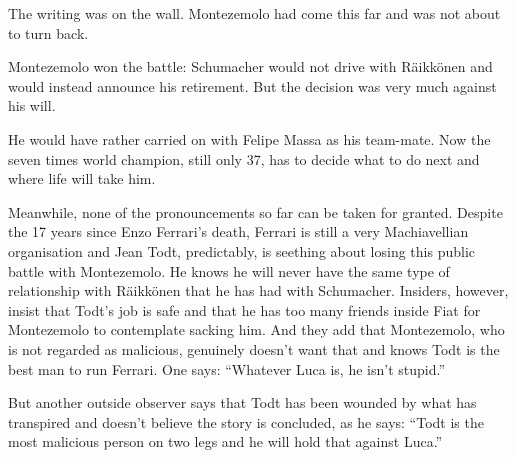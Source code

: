 \documentclass{article}
\begin{document}
The writing was on the wall. Montezemolo had come this far and was not about to turn back.

Montezemolo won the battle: Schumacher would not drive with Räikkönen and would instead announce his retirement. But the decision was very much against his will.

He would have rather carried on with Felipe Massa as his team-mate. Now the seven times world champion, still only 37, has to decide what to do next and where life will take him.

Meanwhile, none of the pronouncements so far can be taken for granted. Despite the 17 years since Enzo Ferrari’s death, Ferrari is still a very Machiavellian organisation and Jean Todt, predictably, is seething about losing this public battle with Montezemolo. He knows he will never have the same type of relationship with Räikkönen that he has had with Schumacher. Insiders, however, insist that Todt’s job is safe and that he has too many friends inside Fiat for Montezemolo to contemplate sacking him. And they add that Montezemolo, who is not regarded as malicious, genuinely doesn’t want that and knows Todt is the best man to run Ferrari. One says: “Whatever Luca is, he isn’t stupid.”

But another outside observer says that Todt has been wounded by what has transpired and doesn’t believe the story is concluded, as he says: “Todt is the most malicious person on two legs and he will hold that against Luca.”
\end{document}
